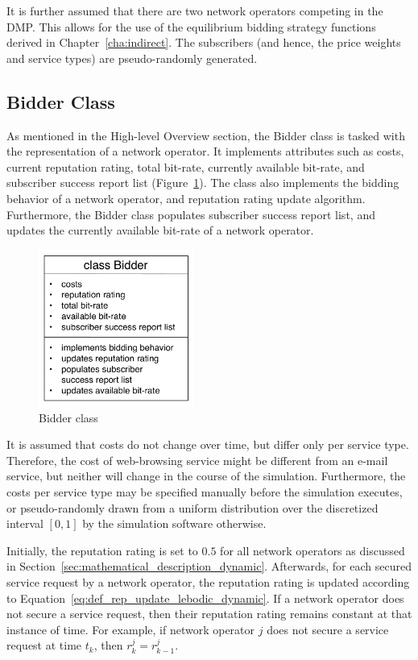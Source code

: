 It is further assumed that there are two network operators competing in the DMP. This allows for the use of the equilibrium bidding strategy functions derived in Chapter~\ref{cha:indirect}. The subscribers (and  hence, the price weights and service types) are pseudo-randomly generated.

\subsection{Bidder Class}
\label{sub:bidder_class_dmappendix}
As mentioned in the High-level Overview section, the Bidder class is tasked with the representation of a network operator. It implements attributes such as costs, current reputation rating, total bit-rate, currently available bit-rate, and subscriber success report list (Figure~\ref{fig:bidder_class_dmappendix}). The class also implements the bidding behavior of a network operator, and reputation rating update algorithm. Furthermore, the Bidder class populates subscriber success report list, and updates the currently available bit-rate of a network operator.

\begin{figure}[t]
	\includegraphics[width=2in]{Appendices/Figures/bidder_class}
	\caption{Bidder class}
	\label{fig:bidder_class_dmappendix}
\end{figure}

It is assumed that costs do not change over time, but differ only per service type. Therefore, the cost of web-browsing service might be different from an e-mail service, but neither will change in the course of the simulation. Furthermore, the costs per service type may be specified manually before the simulation executes, or pseudo-randomly drawn from a uniform distribution over the discretized interval $[0,1]$ by the simulation software otherwise.

Initially, the reputation rating is set to $0.5$ for all network operators as discussed in Section~\ref{sec:mathematical_description_dynamic}. Afterwards, for each secured service request by a network operator, the reputation rating is updated according to Equation~\eqref{eq:def_rep_update_lebodic_dynamic}. If a network operator does not secure a service request, then their reputation rating remains constant at that instance of time. For example, if network operator $j$ does not secure a service request at time $t_k$, then $r^j_k = r^j_{k-1}$.

